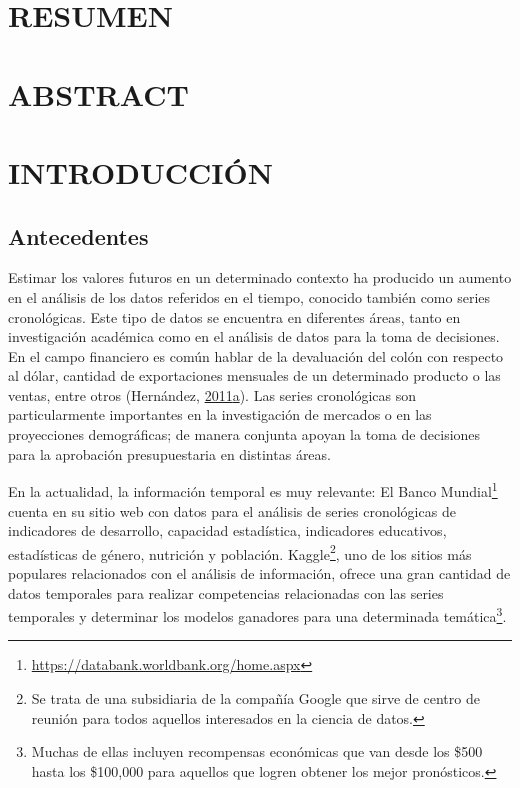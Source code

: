 \documentclass[
]{article}
\begin{document}
\cleardoublepage

\tableofcontents
\listoftables
\listoffigures

\cleardoublepage
{}

\newpage

\section*{RESUMEN}

\cleardoublepage

\section*{ABSTRACT}

\cleardoublepage

\section{INTRODUCCIÓN}

\subsection{Antecedentes}

Estimar los valores futuros en un determinado contexto ha producido un
aumento en el análisis de los datos referidos en el tiempo, conocido
también como series cronológicas. Este tipo de datos se encuentra en
diferentes áreas, tanto en investigación académica como en el análisis
de datos para la toma de decisiones. En el campo financiero es común
hablar de la devaluación del colón con respecto al dólar, cantidad de
exportaciones mensuales de un determinado producto o las ventas, entre
otros (Hernández,
\protect\hyperlink{ref-oscarh-1}{2011}\protect\hyperlink{ref-oscarh-1}{a}).
Las series cronológicas son particularmente importantes en la
investigación de mercados o en las proyecciones demográficas; de manera
conjunta apoyan la toma de decisiones para la aprobación presupuestaria
en distintas áreas.

En la actualidad, la información temporal es muy relevante: El Banco
Mundial\footnote{\url{https://databank.worldbank.org/home.aspx}} cuenta
en su sitio web con datos para el análisis de series cronológicas de
indicadores de desarrollo, capacidad estadística, indicadores
educativos, estadísticas de género, nutrición y población.
Kaggle\footnote{Se trata de una subsidiaria de la compañía Google que
  sirve de centro de reunión para todos aquellos interesados en la
  ciencia de datos.}, uno de los sitios más populares relacionados con
el análisis de información, ofrece una gran cantidad de datos temporales
para realizar competencias relacionadas con las series temporales y
determinar los modelos ganadores para una determinada
temática\footnote{Muchas de ellas incluyen recompensas económicas que
  van desde los \$500 hasta los \$100,000 para aquellos que logren
  obtener los mejor pronósticos.}.
\end{document}
